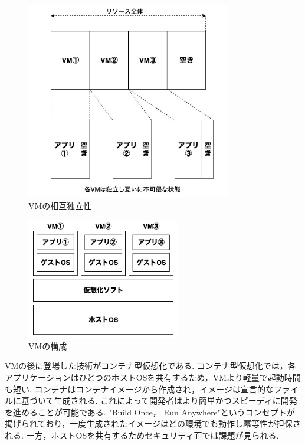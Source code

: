 \begin{figure}[htbp]
\begin{center}
    \includegraphics[width=0.8\textwidth]{./figures/resource-on-vm.jpg}
    \caption{VMの相互独立性}
\end{center}
\end{figure}

\begin{figure}[htbp]
\begin{center}
    \includegraphics[width=0.6\textwidth]{./figures/vm-structure.jpg}
    \caption{VMの構成}
\end{center}
\end{figure}

VMの後に登場した技術がコンテナ型仮想化である.
コンテナ型仮想化では，各アプリケーションはひとつのホストOSを共有するため，VMより軽量で起動時間も短い.
コンテナはコンテナイメージから作成され，イメージは宣言的なファイルに基づいて生成される.
これによって開発者はより簡単かつスピーディに開発を進めることが可能である.
"Build Once， Run Anywhere"というコンセプトが掲げられており，一度生成されたイメージはどの環境でも動作し冪等性が担保される.
一方，ホストOSを共有するためセキュリティ面では課題が見られる.

